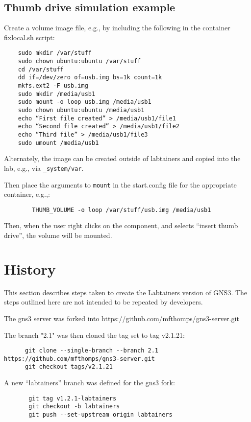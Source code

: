 \documentclass[12pt]{article}
\begin{document}
\subsection{Thumb drive simulation example}
Create a volume image file, e.g., by including the following in the container fixlocal.sh script:
\begin{verbatim}
    sudo mkdir /var/stuff
    sudo chown ubuntu:ubuntu /var/stuff
    cd /var/stuff
    dd if=/dev/zero of=usb.img bs=1k count=1k
    mkfs.ext2 -F usb.img
    sudo mkdir /media/usb1
    sudo mount -o loop usb.img /media/usb1
    sudo chown ubuntu:ubuntu /media/usb1
    echo “First file created” > /media/usb1/file1
    echo “Second file created” > /media/usb1/file2
    echo “Third file” > /media/usb1/file3
    sudo umount /media/usb1
\end{verbatim}
\noindent Alternately, the image can be created outside of labtainers and copied into the lab, e.g., via {\tt \_system/var}.

Then place the arguments to {\tt mount} in the start.config file for the appropriate container, e.g.,:
\begin{verbatim}
        THUMB_VOLUME -o loop /var/stuff/usb.img /media/usb1
\end{verbatim}
\noindent Then, when the user right clicks on the component, and selects ``insert thumb drive'', the volume will be mounted.

\section{History}
This section describes steps taken to create the Labtainers version of GNS3.
The steps outlined here are not intended to be repeated by developers.

The gns3 server was forked into https://github.com/mfthomps/gns3-server.git

The branch "2.1" was then cloned the tag set to tag v2.1.21:
\small
\begin{verbatim}
      git clone --single-branch --branch 2.1 https://github.com/mfthomps/gns3-server.git
      git checkout tags/v2.1.21
\end{verbatim}

\normalsize
\noindent A new ``labtainers'' branch was defined for the gns3 fork:
\begin{verbatim}
       git tag v1.2.1-labtainers
       git checkout -b labtainers
       git push --set-upstream origin labtainers
\end{verbatim}
\end{document}
